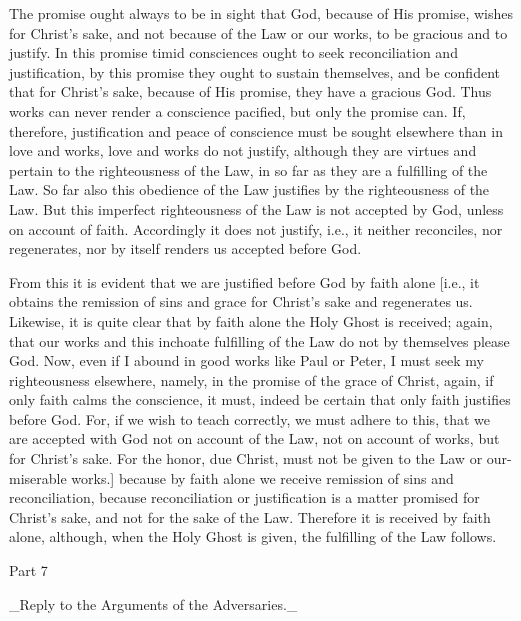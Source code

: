 The promise ought always to be in sight that God, because of His
promise, wishes for Christ's sake, and not because of the Law or our
works, to be gracious and to justify.  In this promise timid
consciences ought to seek reconciliation and justification, by this
promise they ought to sustain themselves, and be confident that for
Christ's sake, because of His promise, they have a gracious God.
Thus works can never render a conscience pacified, but only the
promise can.  If, therefore, justification and peace of conscience
must be sought elsewhere than in love and works, love and works do
not justify, although they are virtues and pertain to the
righteousness of the Law, in so far as they are a fulfilling of the
Law.  So far also this obedience of the Law justifies by the
righteousness of the Law.  But this imperfect righteousness of the
Law is not accepted by God, unless on account of faith.  Accordingly
it does not justify, i.e., it neither reconciles, nor regenerates,
nor by itself renders us accepted before God.

From this it is evident that we are justified before God by faith
alone [i.e., it obtains the remission of sins and grace for Christ's
sake and regenerates us.  Likewise, it is quite clear that by faith
alone the Holy Ghost is received; again, that our works and this
inchoate fulfilling of the Law do not by themselves please God.  Now,
even if I abound in good works like Paul or Peter, I must seek my
righteousness elsewhere, namely, in the promise of the grace of
Christ, again, if only faith calms the conscience, it must, indeed be
certain that only faith justifies before God.  For, if we wish to
teach correctly, we must adhere to this, that we are accepted with
God not on account of the Law, not on account of works, but for
Christ's sake.  For the honor, due Christ, must not be given to the
Law or our-miserable works.] because by faith alone we receive
remission of sins and reconciliation, because reconciliation or
justification is a matter promised for Christ's sake, and not for the
sake of the Law.  Therefore it is received by faith alone, although,
when the Holy Ghost is given, the fulfilling of the Law follows.




Part 7


_Reply to the Arguments of the Adversaries._

